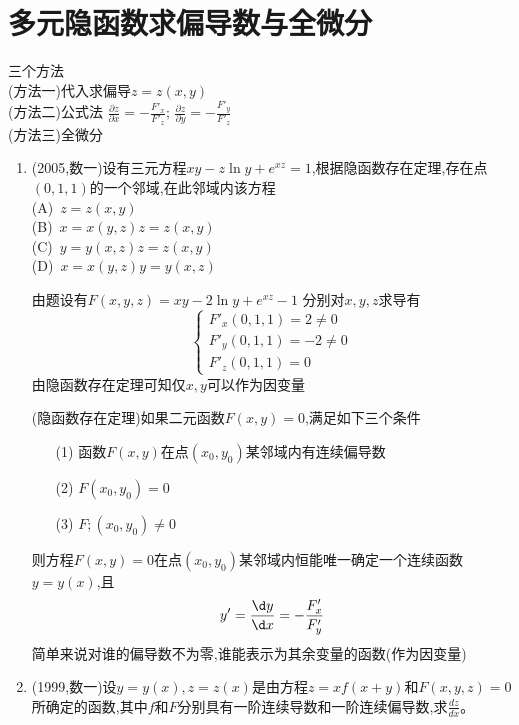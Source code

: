 \documentclass[12pt, a4paper, oneside, UTF8]{ctexbook}
\begin{document}
\section{多元隐函数求偏导数与全微分}
\begin{remark}
    三个方法 \\
    (方法一)代入求偏导$z=z(x,y)$ \\
    {\color{red} (方法二)公式法} $\displaystyle \frac{\partial z}{\partial x} =-\frac{F'_x}{F'_z}$; 
    $\displaystyle \frac{\partial z}{\partial y} =-\frac{F'_y}{F'_z}$ \\
    (方法三)全微分
\end{remark}
\begin{enumerate}[label=\arabic*.,start=6]
    \item (2005,数一)设有三元方程$xy-z\ln y+e^{xz}=1$,根据隐函数存在定理,存在点$(0,1,1)$的一个邻域,在此邻域内该方程 \\
    (A)\ $z=z(x,y)$ \\
    (B)\ $x=x(y,z)$$z=z(x,y)$ \\
    (C)\ $y=y(x,z)$$z=z(x,y)$ \\
    (D)\ $x=x(y,z)$$y=y(x,z)$

    \begin{solution}
    由题设有$F(x,y,z)=xy-2\ln{y}+e^{xz}-1$ 分别对$x,y,z$求导有
    $$
    \begin{cases}
        F'_x(0,1,1)=2\neq 0 \\
        F'_y(0,1,1)=-2\neq 0 \\
        F'_z(0,1,1)=0 
    \end{cases}
    $$
    由隐函数存在定理可知仅$x,y$可以作为因变量
    \end{solution}
    
    \begin{tcolorbox}[title=隐函数存在定理]
        (隐函数存在定理)如果二元函数$F(x,y)=0$,满足如下三个条件
        \begin{enumerate}
            \item [(1)] 函数$F(x,y)$在点$(x_0,y_0)$某邻域内有连续偏导数
            \item [(2)] $F(x_0,y_0)=0$ 
            \item [(3)] $F;(x_0,y_0)\neq 0$
        \end{enumerate}
        则方程$F(x,y)=0$在点$(x_0,y_0)$某邻域内恒能{\color{red}唯一}确定一个连续函数$y=y(x)$,且
        $$
        y' = \frac{\d y}{\d x} = -\frac{F'_x}{F'_y}
        $$
        {\color{red} 简单来说对谁的偏导数不为零,谁能表示为其余变量的函数(作为因变量)}
    \end{tcolorbox}
    \item (1999,数一)设$y=y(x),z=z(x)$是由方程$z=xf(x+y)$和$F(x,y,z)=0$所确定的函数,其中$f$和$F$分别具有一阶连续导数和一阶连续偏导数,求$\frac{dz}{dx}$。
    

\end{enumerate}
\end{document}
